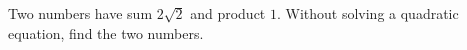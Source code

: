 Two numbers have sum \(2\sqrt2\) and product \(1\). Without solving a quadratic equation, find the two numbers.
